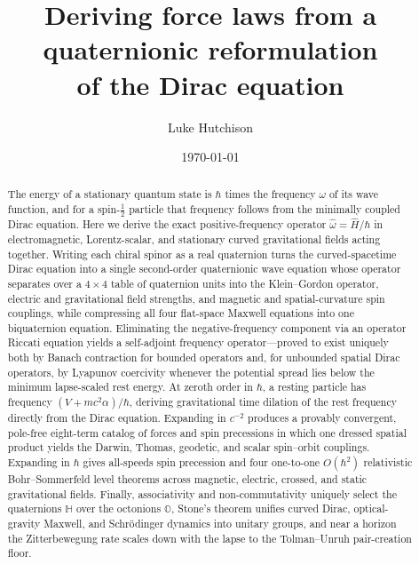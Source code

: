 \documentclass[aps,prd,onecolumn,tightenlines,nofootinbib,notitlepage,10pt,floatfix]{revtex4-2}
\theoremstyle{indentedtheorem}
\begin{document}
\title{Deriving force laws from a quaternionic reformulation\texorpdfstring{\\}{ }%
of the Dirac equation}

\newif\ifanonymous \anonymousfalse %
\newcommand{\companionauthor}{\ifanonymous Anonymous\else L.~Hutchison\fi}
\ifanonymous\else\author{Luke Hutchison}
\noaffiliation\fi
\date{\today}

\begin{abstract}
The energy of a stationary quantum state is $\hbar$ times the frequency $\omega$ of its wave function, and for a spin-$\tfrac{1}{2}$ particle that frequency follows from the minimally coupled Dirac equation. Here we derive the exact positive-frequency operator $\hat{\omega}=\hat{H}/\hbar$ in electromagnetic, Lorentz-scalar, and stationary curved gravitational fields acting together. Writing each chiral spinor as a real quaternion turns the curved-spacetime Dirac equation into a single second-order quaternionic wave equation whose operator separates over a $4\times 4$ table of quaternion units into the Klein--Gordon operator, electric and gravitational field strengths, and magnetic and spatial-curvature spin couplings, while compressing all four flat-space Maxwell equations into one biquaternion equation. Eliminating the negative-frequency component via an operator Riccati equation yields a self-adjoint frequency operator---proved to exist uniquely both by Banach contraction for bounded operators and, for unbounded spatial Dirac operators, by Lyapunov coercivity whenever the potential spread lies below the minimum lapse-scaled rest energy. At zeroth order in $\hbar$, a resting particle has frequency $(V+mc^2\alpha)/\hbar$, deriving gravitational time dilation of the rest frequency directly from the Dirac equation. Expanding in $c^{-2}$ produces a provably convergent, pole-free eight-term catalog of forces and spin precessions in which one dressed spatial product yields the Darwin, Thomas, geodetic, and scalar spin--orbit couplings. Expanding in $\hbar$ gives all-speeds spin precession and four one-to-one $O(\hbar^2)$ relativistic Bohr--Sommerfeld level theorems across magnetic, electric, crossed, and static gravitational fields. Finally, associativity and non-commutativity uniquely select the quaternions $\mathbb{H}$ over the octonions $\mathbb{O}$, Stone's theorem unifies curved Dirac, optical-gravity Maxwell, and Schr\"odinger dynamics into unitary groups, and near a horizon the Zitterbewegung rate scales down with the lapse to the Tolman--Unruh pair-creation floor.
\end{abstract}
\end{document}
